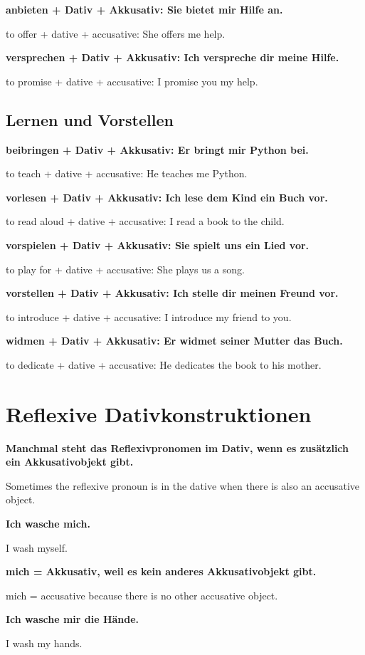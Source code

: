 \documentclass[a4paper]{article}
\newcommand{\EN}[1]{\par{\small\textcolor{TranslationGray}{#1}}\vspace{0.4em}}
\begin{document}
            \textbf{anbieten + Dativ + Akkusativ: Sie bietet mir Hilfe an.}
            \EN{to offer + dative + accusative: She offers me help.}
            
            \textbf{versprechen + Dativ + Akkusativ: Ich verspreche dir meine Hilfe.}
            \EN{to promise + dative + accusative: I promise you my help.}
        
        \subsection{Lernen und Vorstellen}
            
            \textbf{beibringen + Dativ + Akkusativ: Er bringt mir Python bei.}
            \EN{to teach + dative + accusative: He teaches me Python.}
            
            \textbf{vorlesen + Dativ + Akkusativ: Ich lese dem Kind ein Buch vor.}
            \EN{to read aloud + dative + accusative: I read a book to the child.}
            
            \textbf{vorspielen + Dativ + Akkusativ: Sie spielt uns ein Lied vor.}
            \EN{to play for + dative + accusative: She plays us a song.}
            
            \textbf{vorstellen + Dativ + Akkusativ: Ich stelle dir meinen Freund vor.}
            \EN{to introduce + dative + accusative: I introduce my friend to you.}
            
            \textbf{widmen + Dativ + Akkusativ: Er widmet seiner Mutter das Buch.}
            \EN{to dedicate + dative + accusative: He dedicates the book to his mother.}
    
    
    \section{Reflexive Dativkonstruktionen}
        
        \textbf{Manchmal steht das Reflexivpronomen im Dativ, wenn es zusätzlich ein Akkusativobjekt gibt.}
        \EN{Sometimes the reflexive pronoun is in the dative when there is also an accusative object.}
        
        \textbf{Ich wasche mich.}
        \EN{I wash myself.}
        
        \textbf{mich = Akkusativ, weil es kein anderes Akkusativobjekt gibt.}
        \EN{mich = accusative because there is no other accusative object.}
        
        \textbf{Ich wasche mir die Hände.}
        \EN{I wash my hands.}
        
\end{document}
